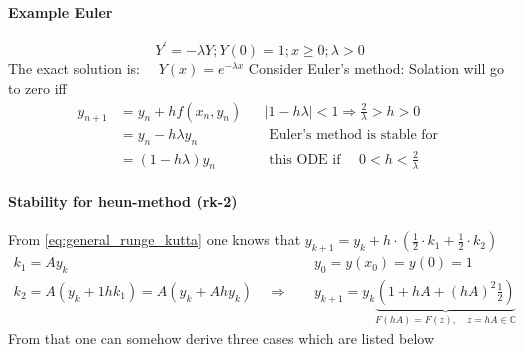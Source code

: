 \paragraph{Example Euler}
$$
Y^{\prime}=-\lambda Y ; Y(0)=1 ; x \geq 0 ; \lambda>0
$$
The exact solution is: $\quad Y(x)=e^{-\lambda x}$
Consider Euler's method: Solation will go to zero iff
$$
\begin{aligned}
y_{n+1} & =y_n+h f\left(x_n, y_n\right) & & |1-h \lambda|<1 \Rightarrow \frac{2}{\lambda}>h>0 \\
& =y_n-h \lambda y_n & & \text { Euler's method is stable for } \\
& =(1-h \lambda) y_n & & \text { this ODE if } \quad 0<h<\frac{2}{\lambda}
\end{aligned}
$$
\paragraph{Stability for heun-method (rk-2)}\mbox{}\newline
From \autoref{eq:general_runge_kutta} one knows that $y_{k+1}=y_k+h\cdot (\frac{1}{2}\cdot k_1+\frac{1}{2}\cdot k_2)$
\begin{equation}
\begin{array}{lc}
k_{1}=A y_{k} & y_{0}=y\left(x_{0}\right)=y(0)=1 \\
k_{2}=A\left(y_{k}+1 h k_{1}\right)=A\left(y_{k}+A h y_{k}\right) \quad \Longrightarrow \quad &y_{k+1}=y_{k} \underbrace{\left(1+h A+(h A)^{2} \frac{1}{2}\right)}_{F(h A)=F(z), \quad z=h A \in \mathbb{C}}
\end{array}
\end{equation}
From that one can somehow derive three cases which are listed below



